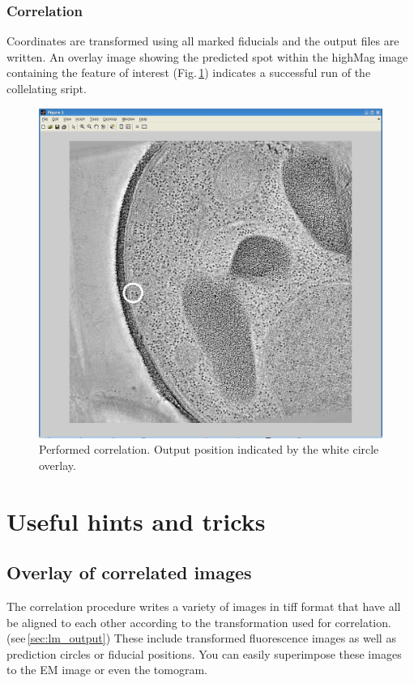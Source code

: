 \documentclass[10pt,a4paper,onepage,DIV12]{scrartcl}
\begin{document}
\subsubsection{Correlation}
Coordinates are transformed using all marked fiducials and the output files are written. An overlay image showing the predicted spot within the highMag image containing the feature of interest (Fig.\,\ref{fig:tfm_HM}) indicates a successful run of the collelating sript.
\begin{figure}[h!]
 \centering
 \includegraphics[width=.5\textwidth]{images/tfm_HM.jpg}
 \caption{Performed correlation. Output position indicated by the white circle overlay.}
 \label{fig:tfm_HM}
\end{figure}
\newpage
% 
% 
% 



\newpage
\section{Useful hints and tricks}
\subsection{Overlay of correlated images}
The correlation procedure writes a variety of images in tiff format that have all be aligned to each other according to the transformation used for correlation. (see\,\ref{sec:lm_output}) These include transformed fluorescence images as well as prediction circles or fiducial positions.
You can easily superimpose these images to the EM image or even the tomogram.
\end{document}
